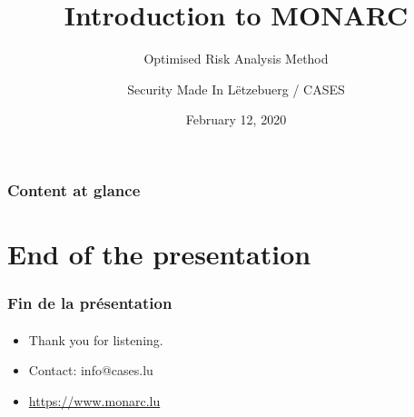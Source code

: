 \documentclass[]{beamer}
\title[Introduction to MONARC]{Introduction to MONARC}
\subtitle{Optimised Risk Analysis Method}
\author[Team CASES]{Security Made In Lëtzebuerg / CASES}
\institute[]{\href{https://www.cases.lu}{Cyberworld Awareness and Security Enhancements Services}}
\date{February 12, 2020}
\begin{document}
\begin{frame}
    \titlepage
\end{frame}



\setcounter{tocdepth}{1}
\begin{frame}
    \frametitle{Content at glance}
    \tableofcontents
\end{frame}
\setcounter{tocdepth}{4}













%
%
\section*{End of the presentation}
\begin{frame}
    \frametitle{Fin de la présentation}
    \framesubtitle{}
    \begin{center}
        \begin{itemize}
            \item Thank you for listening.
            \item Contact: info@cases.lu
            \item \url{https://www.monarc.lu}
        \end{itemize}
    \end{center}
\end{frame}
\end{document}
